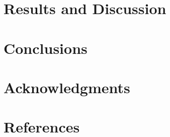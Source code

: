 \documentclass[conf]{new-aiaa}
\begin{document}
% 

\section{Results and Discussion}
\label{R&D}


\section{Conclusions}
\label{Conclusions}


\section*{Acknowledgments}
\label{Acknowledgements}


\section*{References}
\label{Referenes}

\end{document}

